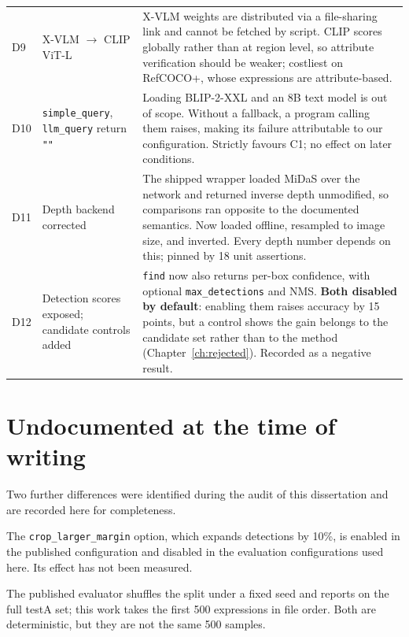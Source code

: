 \documentclass[12pt,a4paper,oneside]{report}
\begin{document}
\begin{longtable}{@{}p{}p{}p{}@{}}
D9 & X-VLM $\to$ CLIP ViT-L & X-VLM weights are distributed via a file-sharing link and
cannot be fetched by script. CLIP scores globally rather than at region level, so
attribute verification should be weaker; costliest on RefCOCO+, whose expressions are
attribute-based. \\

D10 & \texttt{simple\_query}, \texttt{llm\_query} return \texttt{""} & Loading BLIP-2-XXL
and an 8B text model is out of scope. Without a fallback, a program calling them raises,
making its failure attributable to our configuration. Strictly favours C1; no effect on
later conditions. \\

D11 & Depth backend corrected & The shipped wrapper loaded MiDaS over the network and
returned inverse depth unmodified, so comparisons ran opposite to the documented
semantics. Now loaded offline, resampled to image size, and inverted. Every depth number
depends on this; pinned by 18 unit assertions. \\

D12 & Detection scores exposed; candidate controls added & \texttt{find} now also returns
per-box confidence, with optional \texttt{max\_detections} and NMS. \textbf{Both disabled
by default}: enabling them raises accuracy by 15 points, but a control shows the gain
belongs to the candidate set rather than to the method
(Chapter~\ref{ch:rejected}). Recorded as a negative result. \\
\end{longtable}

\section{Undocumented at the time of writing}

Two further differences were identified during the audit of this dissertation and are
recorded here for completeness.

The \texttt{crop\_larger\_margin} option, which expands detections by 10\%, is enabled in
the published configuration and disabled in the evaluation configurations used here. Its
effect has not been measured.

The published evaluator shuffles the split under a fixed seed and reports on the full
testA set; this work takes the first 500 expressions in file order. Both are
deterministic, but they are not the same 500 samples.

\end{document}
